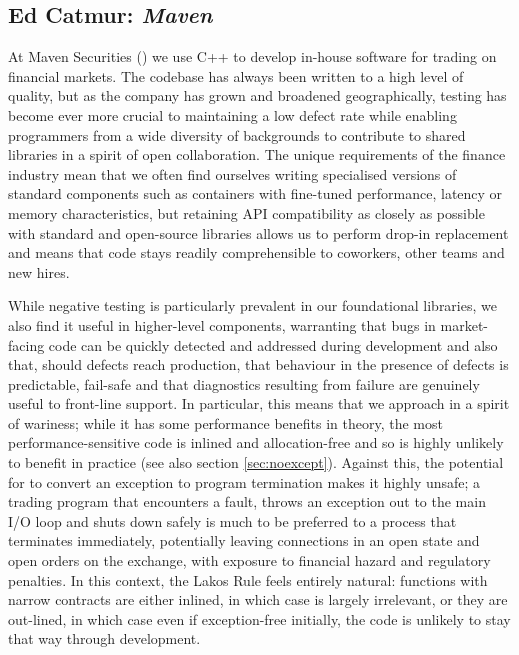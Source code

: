 \subsection{Ed Catmur: \emph{Maven}}

At Maven Securities (\hyperref[https://www.mavensecurities.com/]{}) we use C++ to develop in-house software for trading on financial markets. The codebase has always been written to a high level of quality, but as the company has grown and broadened geographically, testing has become ever more crucial to maintaining a low defect rate while enabling programmers from a wide diversity of backgrounds to contribute to shared libraries in a spirit of open collaboration. The unique requirements of the finance industry mean that we often find ourselves writing specialised versions of standard components such as containers with fine-tuned performance, latency or memory characteristics, but retaining API compatibility as closely as possible with standard and open-source libraries allows us to perform drop-in replacement and means that code stays readily comprehensible to coworkers, other teams and new hires.

While negative testing is particularly prevalent in our foundational libraries, we also find it useful in higher-level components, warranting that bugs in market-facing code can be quickly detected and addressed during development and also that, should defects reach production, that behaviour in the presence of defects is predictable, fail-safe and that diagnostics resulting from failure are genuinely useful to front-line support. In particular, this means that we approach  in a spirit of wariness; while it has some performance benefits in theory, the most performance-sensitive code is inlined and allocation-free and so is highly unlikely to benefit in practice (see also section \ref{sec:noexcept}). Against this, the potential for  to convert an exception to program termination makes it highly unsafe; a trading program that encounters a fault, throws an exception out to the main I/O loop and shuts down safely is much to be preferred to a process that terminates immediately, potentially leaving connections in an open state and open orders on the exchange, with exposure to financial hazard and regulatory penalties. In this context, the Lakos Rule feels entirely natural: functions with narrow contracts are either inlined, in which case  is largely irrelevant, or they are out-lined, in which case even if exception-free initially, the code is unlikely to stay that way through development.

